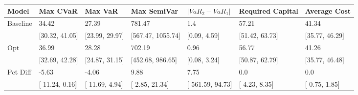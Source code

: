 \begin{tabular}{lllllll}
\toprule
   Model &       Max CVaR &        Max VaR &       Max SemiVar & $|VaR_2 - VaR_1|$ & Required Capital &   Average Cost \\
\midrule
Baseline &          34.42 &          27.39 &            781.47 &               1.4 &            57.21 &          41.34 \\
         & [30.32, 41.05] & [23.99, 29.97] & [567.47, 1055.74] &      [0.09, 4.59] &   [51.42, 63.73] & [35.77, 46.29] \\
     Opt &          36.99 &          28.28 &            702.19 &              0.96 &            56.77 &          41.26 \\
         & [32.69, 42.28] & [24.87, 31.15] &  [452.68, 986.65] &      [0.08, 3.24] &   [50.87, 62.79] & [35.77, 46.48] \\
Pct Diff &          -5.63 &          -4.06 &              9.88 &              7.75 &              0.0 &            0.0 \\
         & [-11.24, 0.16] & [-11.69, 4.94] &    [-2.85, 21.34] &  [-561.59, 94.73] &    [-4.23, 8.35] &  [-0.75, 1.85] \\
\bottomrule
\end{tabular}
